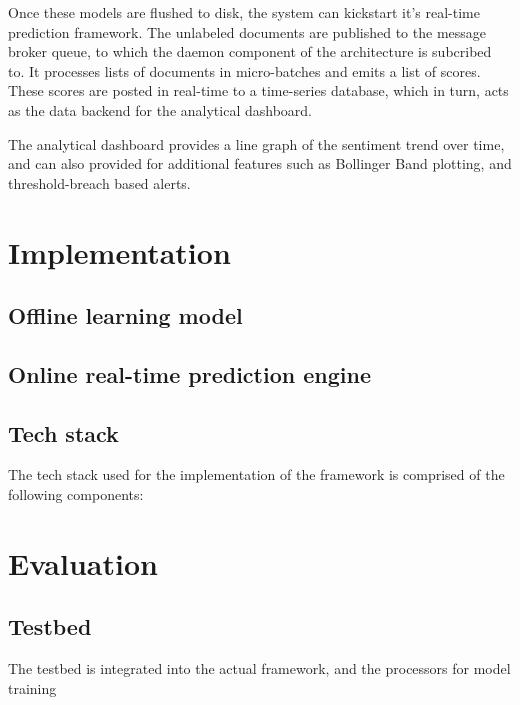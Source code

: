 \documentclass[conference]{IEEEtran}
\begin{document}
Once these models are flushed to disk, the system can kickstart it's real-time prediction framework. The unlabeled documents are published to the message broker queue, to which the daemon component of the architecture is subcribed to. It processes lists of documents in micro-batches and emits a list of scores. These scores are posted in real-time to a time-series database, which in turn, acts as the data backend for the analytical dashboard.

The analytical dashboard provides a line graph of the sentiment trend over time, and can also provided for additional features such as Bollinger Band plotting, and threshold-breach based alerts.




\section{Implementation}


\subsection{Offline learning model}

\subsection{Online real-time prediction engine}

\subsection{Tech stack}
The tech stack used for the implementation of the framework is comprised of the following components:


\section{Evaluation}

\subsection{Testbed}
The testbed is integrated into the actual framework, and the processors for model training 
\end{document}
